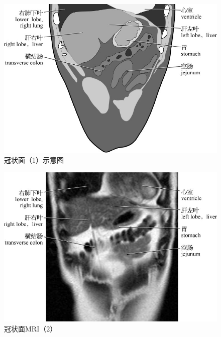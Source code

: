 \begin{figure}[!htbp]
 \centering
 \includegraphics{./images/Image00094.jpg}
 \captionsetup{justification=centering}
 \caption{冠状面（1）示意图}
  \end{figure} 
 \FloatBarrier

\begin{figure}[!htbp]
 \centering
 \includegraphics{./images/Image00095.jpg}
 \captionsetup{justification=centering}
 \caption{冠状面MRI（2）}
  \end{figure} 
 \FloatBarrier

